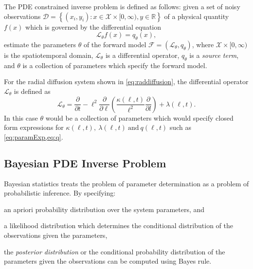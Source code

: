 The PDE constrained inverse problem is defined as follows: given a set of noisy observations 
$\mathcal{D} = \left\{ (x_i, y_i): x \in \mathcal{X} \times [0, \infty), y \in \mathbb{R} \right\}$ 
of a physical quantity $f(x)$ which is governed by the differential equation 
\begin{equation}\label{eq:forwardModel}
  \mathcal{L}_{\theta} f(x) = q_{\theta}(x),
\end{equation} 
estimate the parameters $\theta$ of the forward model 
$\mathcal{F} = \left( \mathcal{L}_{\theta}, q_{\theta} \right)$, where 
$\mathcal{X} \times [0, \infty)$ is the spatiotemporal domain, $\mathcal{L}_{\theta}$ is a 
differential operator, $q_{\theta}$ is a \emph{source term}, and $\theta$ is a collection of 
parameters which specify the forward model. 

For the radial diffusion system shown in \cref{eq:raddiffusion}, the differential operator 
$\mathcal{L}_{\theta}$ is defined as   
%
\[
  \mathcal{L}_{\theta} =
    \frac{\partial}{\partial{t}} - 
    \ell^2 \frac{\partial}{\partial{\ell}}\left( 
      \frac{\kappa(\ell, t)}{\ell^{2}} \frac{\partial}{\partial{l}} 
    \right) + 
    \lambda(\ell,t).  
\] 
%
In this case $\theta$ would be a collection of parameters which would specify closed form 
expressions for $\kappa(\ell, t), \ \lambda(\ell, t) \ \text{and} \ q(\ell, t)$ such as 
\cref{eq:paramExp,eq:q}.


\subsection{Bayesian PDE Inverse Problem}

Bayesian statistics \citep{lee1997bayesian} treats the problem of parameter determination as a 
problem of probabilistic inference. By specifying: 
\begin{enumerate*} 
  \item an apriori probability distribution over the system parameters, and 
  \item a likelihood distribution which determines the conditional distribution of the observations 
        given the parameters, 
\end{enumerate*} 
the \emph{posterior distribution} or the conditional probability distribution of the parameters 
given the observations can be computed using Bayes rule.

